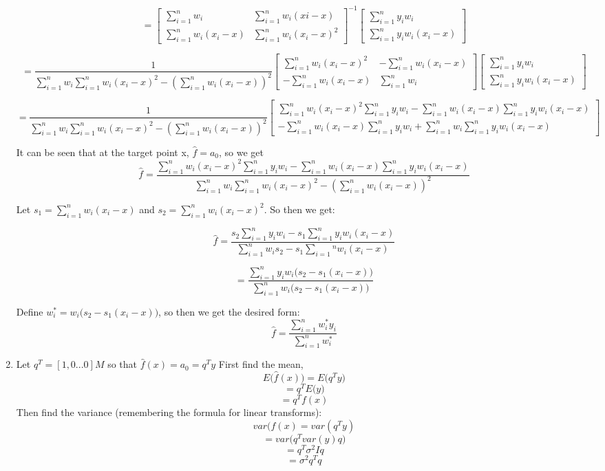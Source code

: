 \documentclass[10pt]{article}
\begin{document}
\begin{enumerate}[label=(\Alph*)]
        $$=\begin{bmatrix}
        \sum_{i=1}^nw_i & \sum_{i=1}^{n}w_i(xi-x) \\
        \sum_{i=1}^{n}w_i(x_i-x) & \sum_{i=1}^nw_i(x_i-x)^2
        \end{bmatrix}^{-1}
        \begin{bmatrix}
        \sum_{i=1}^{n}y_iw_i \\
        \sum_{i=1}^n y_iw_i(x_i-x)
        \end{bmatrix}$$

        $$=\frac{1}{\sum_{i=1}^nw_i \sum_{i=1}^nw_i(x_i-x)^2 - (\sum_{i=1}^nw_i (x_i-x))^2}
        \begin{bmatrix}
        \sum_{i=1}^nw_i(x_i-x)^2 & -\sum_{i=1}^{n}w_i(x_i-x) \\
        -\sum_{i=1}^{n}w_i(x_i-x) & \sum_{i=1}^nw_i     
        \end{bmatrix}
        \begin{bmatrix}
        \sum_{i=1}^{n}y_iw_i \\
        \sum_{i=1}^n y_iw_i(x_i-x)
        \end{bmatrix}$$

        $$=\frac{1}{\sum_{i=1}^nw_i \sum_{i=1}^nw_i(x_i-x)^2 - (\sum_{i=1}^nw_i (x_i-x))^2}
        \begin{bmatrix}
        \sum_{i=1}^nw_i(x_i-x)^2\sum_{i=1}^ny_iw_i - \sum_{i=1}^nw_i(x_i-x)\sum_{i=1}^ny_iw_i(x_i-x) \\
        -\sum_{i=1}^nw_i(x_i-x)\sum_{i=1}^ny_iw_i+\sum_{i=1}^nw_i\sum_{i=1}^ny_iw_i(x_i-x)
        \end{bmatrix}$$

        It can be seen that at the target point x, $\hat{f} = a_0$, so we get 
        $$\hat{f} =  \frac{\sum_{i=1}^nw_i(x_i-x)^2\sum_{i=1}^ny_iw_i - \sum_{i=1}^nw_i(x_i-x)\sum_{i=1}^ny_iw_i(x_i-x)}{\sum_{i=1}^nw_i \sum_{i=1}^nw_i(x_i-x)^2 - (\sum_{i=1}^nw_i (x_i-x))^2}$$

        Let $s_1 = \sum_{i=1}^nw_i(x_i-x)$ and $s_2 = \sum_{i=1}^nw_i(x_i-x)^2$. So then we get:

        $$\hat{f} = \frac{s_2\sum_{i=1}^ny_iw_i-s_1\sum_{i=1}^ny_iw_i(x_i-x)}{\sum_{i=1}^nw_is_2 - s_1\sum_{i=1}\textbf{}^nw_i(x_i-x)}$$

        $$= \frac{\sum_{i=1}^ny_iw_i\big(s_2-s_1(x_i-x)\big)}{\sum_{i=1}^nw_i\big(s_2-s_1(x_i-x)\big)}$$

        Define $w_i^* = w_i\big(s_2 - s_1(x_i-x)\big)$, so then we get the desired form:
        $$\hat{f} = \frac{\sum_{i=1}^nw_i^*y_i}{\sum_{i=1}^nw_i^*}$$
        \item
        Let $q^T=[1,0...0]M$ so that $\hat{f}(x)=a_0=q^Ty$ First find the mean, 
        $$E\big(\hat{f}(x)\big) = E\big(q^Ty\big)$$
        $$=q^T E\big(y\big)$$
        $$ = q^Tf(x)$$
        Then find the variance (remembering the formula for linear transforms):
        $$var(\hat{f}(x) = var(q^Ty)$$
        $$=var\big(q^Tvar(y)q\big)$$
        $$=q^T\sigma^2Iq$$
        $$=\sigma^2q^Tq$$


\end{enumerate}
\end{document}
